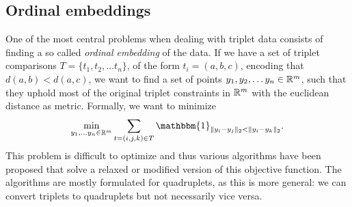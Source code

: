 \subsection{Ordinal embeddings}
One of the most central problems when dealing with triplet data consists of finding a so called \textit{ordinal embedding} of the data. If we have a set of triplet comparisons $T = \{t_1, t_2, \ldots t_n\}$, 
of the form $t_i = \left( a,b,c \right)$, encoding that $d(a,b) < d(a,c)$, 
we want to find a set of points $y_1, y_2, \ldots y_n \in \mathbb{R}^{m}$, such that they uphold most of the original triplet constraints in $\mathbb{R}^{m}$ with the euclidean distance
as metric. Formally, we want to minimize \citep{vankadaraInsightsOrdinalEmbedding2021}
\begin{align*}
    \min_{y_1, \ldots y_n \in \R^{m}} \sum_{t=\left( i,j,k \right)  \in T} \mathbbm{1}_{ \|y_i - y_j\|_2 < \|y_i - y_k\|_2 }
.\end{align*}
This problem is difficult to optimize and thus various algorithms have been proposed that solve a relaxed or modified version of this objective function. The algorithms are mostly formulated
for quadruplets, as this is more general: we can convert triplets to quadruplets but not 
necessarily vice versa.

